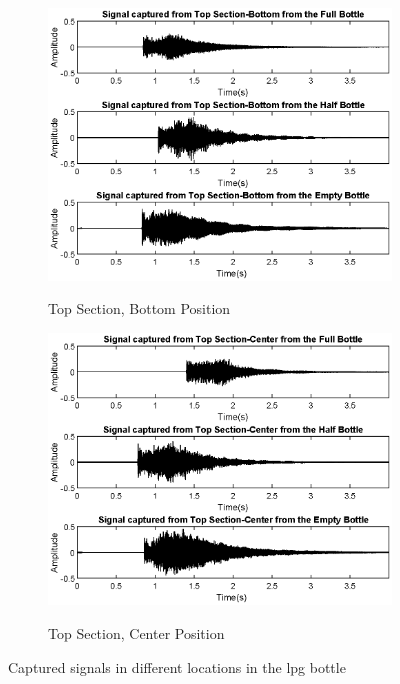 \begin{figure}[]
\begin{subfigure}{0.45\textwidth}
        \label{subfig:timeLowCenMic}
    \end{subfigure}
    \begin{subfigure}{0.45\textwidth}
        \centering
        \includegraphics[width=\linewidth]{Chapters/6CHP/Figures/TimeTopBottom.eps}
        \caption{Top Section, Bottom Position}{}
        \label{subfig:timeTopBotMic}
    \end{subfigure}
    \begin{subfigure}{0.45\textwidth}
        \centering
        \includegraphics[width=\linewidth]{Chapters/6CHP/Figures/TimeTopCenter.eps}
        \caption{Top Section, Center Position}{}
        \label{subfig:timeTopCenMic}
    \end{subfigure}
    \caption{Captured signals in different locations in the \acrshort{lpg} bottle}{}
     \label{fig:TimeRealDataMic}
\end{figure}

